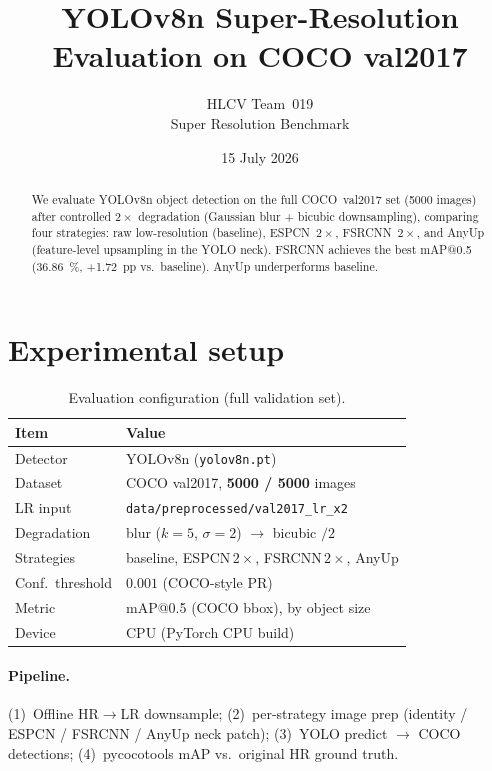 \documentclass[11pt,a4paper]{article}
\title{YOLOv8n Super-Resolution Evaluation on COCO val2017}
\author{HLCV Team~019 \\ Super Resolution Benchmark}
\date{15 July 2026}
\begin{document}
\maketitle

\begin{abstract}
We evaluate YOLOv8n object detection on the full COCO~val2017 set
(\num{5000} images) after controlled $2\times$ degradation
(Gaussian blur + bicubic downsampling), comparing four strategies:
raw low-resolution (baseline), ESPCN~$2\times$, FSRCNN~$2\times$, and
AnyUp (feature-level upsampling in the YOLO neck).
FSRCNN achieves the best mAP@0.5 (\SI{36.86}{\percent},
+\SI{1.72}{pp} vs.\ baseline). AnyUp underperforms baseline.
\end{abstract}

\tableofcontents
\vspace{1em}

\section{Experimental setup}
\label{sec:setup}

\begin{table}[H]
\centering
\caption{Evaluation configuration (full validation set).}
\label{tab:setup}
\begin{tabular}{@{}ll@{}}
\toprule
\textbf{Item} & \textbf{Value} \\
\midrule
Detector & YOLOv8n (\texttt{yolov8n.pt}) \\
Dataset & COCO val2017, \textbf{5000 / 5000} images \\
LR input & \texttt{data/preprocessed/val2017\_lr\_x2} \\
Degradation & blur ($k{=}5$, $\sigma{=}2$) $\rightarrow$ bicubic $/2$ \\
Strategies & baseline, ESPCN\,$2\times$, FSRCNN\,$2\times$, AnyUp \\
Conf.\ threshold & $0.001$ (COCO-style PR) \\
Metric & mAP@0.5 (COCO bbox), by object size \\
Device & CPU (PyTorch CPU build) \\
\bottomrule
\end{tabular}
\end{table}

\paragraph{Pipeline.}
(1)~Offline HR$\rightarrow$LR downsample;
(2)~per-strategy image prep (identity / ESPCN / FSRCNN / AnyUp neck patch);
(3)~YOLO predict $\rightarrow$ COCO detections;
(4)~pycocotools mAP vs.\ original HR ground truth.
\end{document}
